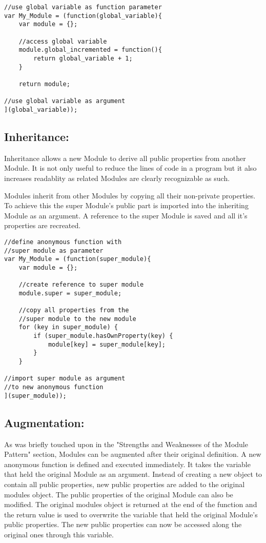 \documentclass{bioinfo}
\begin{document}
\begin{lstlisting}
//use global variable as function parameter
var My_Module = (function(global_variable){
	var module = {};

	//access global variable
	module.global_incremented = function(){
		return global_variable + 1;
	}

	return module;

//use global variable as argument
](global_variable));
\end{lstlisting}

\subsection{Inheritance:}

Inheritance allows a new Module to derive all public properties from another Module. It is not only useful to reduce the lines of code in a program but it also increases readablity as related Modules are clearly recognizable as such.\vspace{\baselineskip}


Modules inherit from other Modules by copying all their non-private properties. To achieve this the super Module's public part is imported into the inheriting Module as an argument. A reference to the super Module is saved and all it's properties are recreated.\vspace{\baselineskip}

\begin{lstlisting}
//define anonymous function with
//super module as parameter
var My_Module = (function(super_module){
	var module = {};

	//create reference to super module
	module.super = super_module;

	//copy all properties from the
	//super module to the new module
	for (key in super_module) {
		if (super_module.hasOwnProperty(key) {
			module[key] = super_module[key];
		}
	}

//import super module as argument
//to new anonymous function
](super_module));
\end{lstlisting}


\subsection{Augmentation:}
As was briefly touched upon in the "Strengths and Weaknesses of the Module Pattern" section, Modules can be augmented after their original definition. A new anonymous function is defined and executed immediately. It takes the variable that held the original Module as an argument. Instead of creating a new object to contain all public properties, new public properties are added to the original modules object. The public properties of the original Module can also be modified. The original modules object is returned at the end of the function and the return value is used to overwrite the variable that held the original Module's public properties. The new public properties can now be accessed along the original ones through this variable. \\
\end{document}
